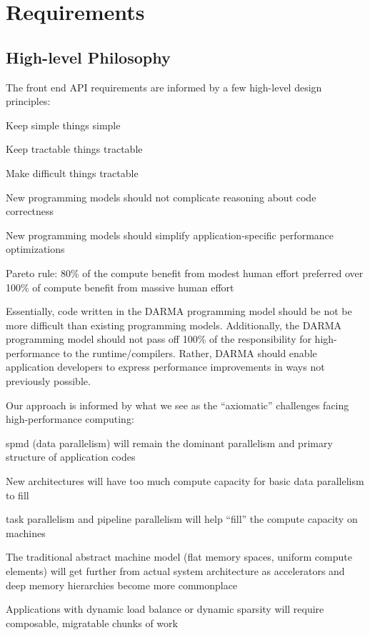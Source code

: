 
\chapter{Requirements} 
\label{chap:requirements} 
\section{High-level Philosophy}
The \gls{front end} \gls{API} requirements are informed by a few high-level design principles:
\begin{compactitem}
\item Keep simple things simple
\item Keep tractable things tractable
\item Make difficult things tractable
\item New \glspl{programming model} should not complicate reasoning about code correctness
\item New \glspl{programming model} should simplify application-specific performance optimizations
\item Pareto rule: 80\% of the compute benefit from modest human effort preferred over 100\% of compute benefit from massive human effort
\end{compactitem}

Essentially, code written in the \gls{DARMA} \gls{programming model} should be
not be more difficult than existing \glspl{programming model}.
Additionally, the \gls{DARMA} \gls{programming model} should not pass off 100\% 
of the responsibility for high-performance to the runtime/compilers.
Rather, \gls{DARMA} should enable application developers to express performance improvements in ways not previously possible.

Our approach is informed by what we see as the ``axiomatic'' challenges facing high-performance computing:
\begin{compactitem}
\item \gls{spmd} (\gls{data parallelism}) will remain the dominant parallelism
  and primary structure of application codes
\item New architectures will have too much compute capacity for basic \gls{data
  parallelism} to fill
\item \Gls{task parallelism} and \gls{pipeline parallelism} will help ``fill'' the compute capacity on machines
\item The traditional \gls{abstract machine model} (flat memory spaces, uniform compute elements) will get further from 
  actual system architecture as accelerators and deep memory hierarchies become more commonplace
\item Applications with dynamic load balance or dynamic sparsity will require composable, migratable chunks of work
\end{compactitem}

